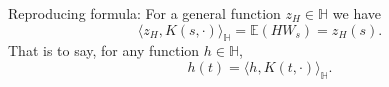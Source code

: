 Reproducing formula:
For a general function $z_H \in \mathbb{H}$ we have $$\langle z_H, K(s, \cdot)\rangle_{\mathbb{H}} = \mathbb{E}(H W_s) = z_H(s).$$
That is to say, for any function  $h \in \mathbb{H}$,
	$$h(t) = \langle h, K(t, \cdot)\rangle_{\mathbb{H}}.$$




%		


